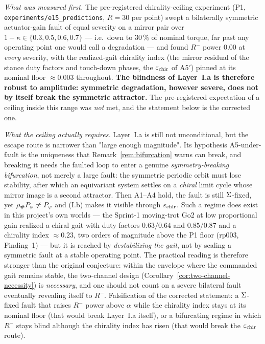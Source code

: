 \begin{remark}
\label{rem:amplitude-ceiling}
\emph{What was measured first.} The pre-registered chirality-ceiling experiment
(P1, \texttt{experiments/e15\_predictions}, $R = 30$ per point) swept a
bilaterally symmetric actuator-gain fault of equal severity on a mirror pair
over $1-\kappa \in \{0.3, 0.5, 0.6, 0.7\}$ --- i.e.\ down to $30\,\%$ of nominal
torque, far past any operating point one would call a degradation --- and found
$R^-$ power $0.00$ at \emph{every} severity, with the realized-gait chirality
index (the mirror residual of the stance duty factors and touch-down phases,
the $\varepsilon_{\mathrm{chir}}$ of A5$'$) pinned at its nominal floor $\approx 0.003$
throughout. \textbf{The blindness of Layer~I.a is therefore robust to
amplitude: symmetric degradation, however severe, does not by itself break the
symmetric attractor.} The pre-registered expectation of a ceiling inside this
range was \emph{not} met, and the statement below is the corrected one.

\emph{What the ceiling actually requires.} Layer~I.a is still not
unconditional, but the escape route is narrower than "large enough magnitude".
Its hypothesis A5-under-fault is the uniqueness that
Remark~\ref{rem:bifurcation} warns can break, and breaking it needs the faulted
loop to enter a genuine \emph{symmetry-breaking bifurcation}, not merely a large
fault: the symmetric periodic orbit must lose stability, after which an
equivariant system settles on a \emph{chiral} limit cycle whose mirror image is a
second attractor. Then A1--A4 hold, the fault is still $\Sigma$-fixed, yet
${\rho}_{\#}P_\varphi \neq P_\varphi$ and (I.b) makes it visible through
$\varepsilon_{\mathrm{chir}}$. Such a regime does exist in this project's own worlds --- the
Sprint-1 moving-trot Go2 at low proportional gain realized a chiral gait with
duty factors $0.63/0.64$ and $0.85/0.87$ and a chirality index $\approx 0.23$,
two orders of magnitude above the P1 floor (rp003, Finding~1) --- but it is
reached by \emph{destabilizing the gait}, not by scaling a symmetric fault at a
stable operating point. The practical reading is therefore stronger than the
original conjecture: within the envelope where the commanded gait remains
stable, the two-channel design
(Corollary~\ref{cor:two-channel-necessity}) is \emph{necessary}, and one should
not count on a severe bilateral fault eventually revealing itself to $R^-$.
Falsification of the corrected statement: a $\Sigma$-fixed fault that raises
$R^-$ power above $\alpha$ while the chirality index stays at its nominal floor
(that would break Layer~I.a itself), or a bifurcating regime in which $R^-$
stays blind although the chirality index has risen (that would break the
$\varepsilon_{\mathrm{chir}}$ route).
\end{remark}

